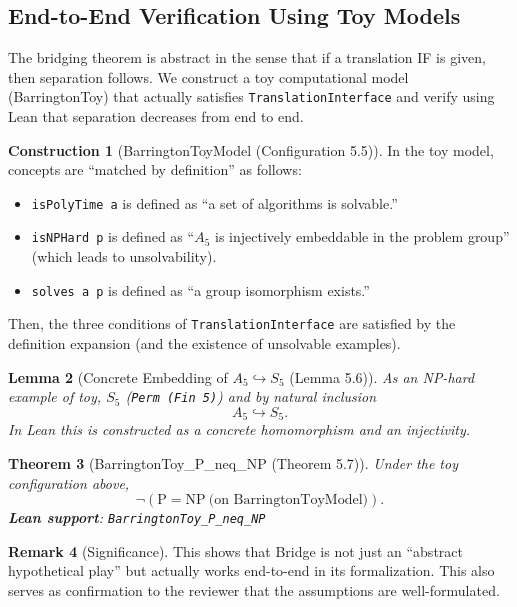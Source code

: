 \documentclass[11pt,a4paper]{article}
\theoremstyle{plain}
\newtheorem{theorem}{Theorem}[section]
\newtheorem{lemma}[theorem]{Lemma}
\theoremstyle{definition}
\newtheorem{remark}[theorem]{Remark}
\newtheorem{construction}[theorem]{Construction}
\newcommand{\Aalt}{A_5}
\newcommand{\Sfive}{S_5}
\newcommand{\TranslationInterface}{\texttt{TranslationInterface}}
\newcommand{\lean}[1]{\texttt{#1}}
\begin{document}
\subsection{End-to-End Verification Using Toy Models}

The bridging theorem is abstract in the sense that if a translation IF is given, then separation follows. We construct a toy computational model (BarringtonToy) that actually satisfies \TranslationInterface{} and verify using Lean that separation decreases from end to end.

\begin{construction}[BarringtonToyModel (Configuration 5.5)]
In the toy model, concepts are ``matched by definition'' as follows:
\begin{itemize}[nosep]
\item \lean{isPolyTime a} is defined as ``a set of algorithms is solvable.''
\item \lean{isNPHard p} is defined as ``$\Aalt$ is injectively embeddable in the problem group'' (which leads to unsolvability).
\item \lean{solves a p} is defined as ``a group isomorphism exists.''
\end{itemize}
Then, the three conditions of \TranslationInterface{} are satisfied by the definition expansion (and the existence of unsolvable examples).
\end{construction}

\begin{lemma}[Concrete Embedding of $\Aalt \hookrightarrow \Sfive$ (Lemma 5.6)]
As an NP-hard example of toy, $\Sfive$ (\lean{Perm (Fin 5)}) and by natural inclusion
\[
\Aalt \hookrightarrow \Sfive.
\]
In Lean this is constructed as a concrete homomorphism and an injectivity.
\end{lemma}

\begin{theorem}[BarringtonToy\_P\_neq\_NP (Theorem 5.7)]
Under the toy configuration above,
\[
\neg(\mathrm{P}=\mathrm{NP}\ \text{(on BarringtonToyModel)}).
\]
\textbf{Lean support}: \lean{BarringtonToy\_P\_neq\_NP}
\end{theorem}

\begin{remark}[Significance]
This shows that Bridge is not just an ``abstract hypothetical play'' but actually works end-to-end in its formalization. This also serves as confirmation to the reviewer that the assumptions are well-formulated.
\end{remark}
\end{document}
